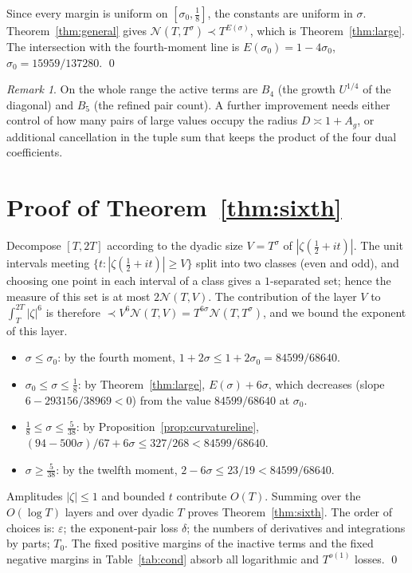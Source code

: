\documentclass[11pt]{amsart}
\theoremstyle{definition}
\theoremstyle{remark}
\newtheorem{remark}[theorem]{Remark}
\numberwithin{equation}{section}
\newcommand{\cN}{\mathcal{N}}
\begin{document}
Since every margin is uniform on $[\sigma_0,\frac18]$, the constants are uniform in $\sigma$. Theorem~\ref{thm:general} gives $\cN(T,T^\sigma)\prec T^{E(\sigma)}$, which is Theorem~\ref{thm:large}. The intersection with the fourth-moment line is $E(\sigma_0)=1-4\sigma_0$, $\sigma_0=15959/137280$. \qed

\begin{remark}
On the whole range the active terms are $B_4$ (the growth $U^{1/4}$ of the diagonal) and $B_5$ (the refined pair count). A further improvement needs either control of how many pairs of large values occupy the radius $D\asymp1+A_g$, or additional cancellation in the tuple sum that keeps the product of the four dual coefficients.
\end{remark}

\section{Proof of Theorem~\ref{thm:sixth}}\label{sec:moment}

Decompose $[T,2T]$ according to the dyadic size $V=T^\sigma$ of $|\zeta(\frac12+it)|$. The unit intervals meeting $\{t:|\zeta(\frac12+it)|\ge V\}$ split into two classes (even and odd), and choosing one point in each interval of a class gives a $1$-separated set; hence the measure of this set is at most $2\cN(T,V)$. The contribution of the layer $V$ to $\int_T^{2T}|\zeta|^6$ is therefore $\prec V^6\cN(T,V)=T^{6\sigma}\cN(T,T^\sigma)$, and we bound the exponent of this layer.
\begin{itemize}
\item $\sigma\le\sigma_0$: by the fourth moment, $1+2\sigma\le1+2\sigma_0=84599/68640$.
\item $\sigma_0\le\sigma\le\frac18$: by Theorem~\ref{thm:large}, $E(\sigma)+6\sigma$, which decreases (slope $6-293156/38969<0$) from the value $84599/68640$ at $\sigma_0$.
\item $\frac18\le\sigma\le\frac5{38}$: by Proposition~\ref{prop:curvatureline}, $(94-500\sigma)/67+6\sigma\le327/268<84599/68640$.
\item $\sigma\ge\frac5{38}$: by the twelfth moment, $2-6\sigma\le23/19<84599/68640$.
\end{itemize}
Amplitudes $|\zeta|\le1$ and bounded $t$ contribute $O(T)$. Summing over the $O(\log T)$ layers and over dyadic $T$ proves Theorem~\ref{thm:sixth}. The order of choices is: $\varepsilon$; the exponent-pair loss $\delta$; the numbers of derivatives and integrations by parts; $T_0$. The fixed positive margins of the inactive terms and the fixed negative margins in Table~\ref{tab:cond} absorb all logarithmic and $T^{o(1)}$ losses. \qed
\end{document}
